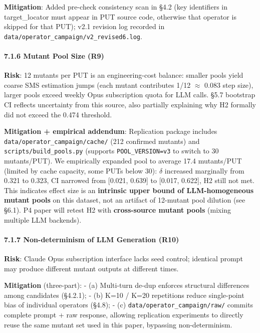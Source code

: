 \documentclass[review,12pt,authoryear]{elsarticle}
\begin{document}
\textbf{Mitigation}: Added pre-check consistency scan in §4.2 (key
identifiers in target\_locator must appear in PUT source code, otherwise
that operator is skipped for that PUT); v2.1 revision log recorded in
\texttt{data/operator\_campaign/v2\_revised6.log}.

\paragraph{7.1.6 Mutant Pool Size (R9)}\label{mutant-pool-size-r9}

\textbf{Risk}: 12 mutants per PUT is an engineering-cost balance:
smaller pools yield coarse SMS estimation jumps (each mutant contributes
1/12 $\approx$ 0.083 step size), larger pools exceed weekly Opus subscription
quota for LLM calls. §5.7 bootstrap CI reflects uncertainty from this
source, also partially explaining why H2 formally did not exceed the
0.474 threshold.

\textbf{Mitigation + empirical addendum}: Replication package includes
\texttt{data/operator\_campaign/cache/} (212 confirmed mutants) and
\texttt{scripts/build\_pools.py} (supports \texttt{POOL\_VERSION=v3} to
switch to 30 mutants/PUT). We empirically expanded pool to average 17.4
mutants/PUT (limited by cache capacity, some PUTs below 30): $\delta$ increased
marginally from 0.321 to 0.323, CI narrowed from {[}0.021, 0.639{]} to
{[}0.017, 0.622{]}, H2 still not met. This indicates effect size is an
\textbf{intrinsic upper bound of LLM-homogeneous mutant pools} on this
dataset, not an artifact of 12-mutant pool dilution (see §6.1). P4 paper
will retest H2 with \textbf{cross-source mutant pools} (mixing multiple
LLM backends).

\paragraph{7.1.7 Non-determinism of LLM Generation
(R10)}\label{non-determinism-of-llm-generation-r10}

\textbf{Risk}: Claude Opus subscription interface lacks seed control;
identical prompt may produce different mutant outputs at different
times.

\textbf{Mitigation} (three-part): - (a) Multi-turn de-dup enforces
structural differences among candidates (§4.2.1); - (b) K=10 / K=20
repetitions reduce single-point bias of individual operators (§4.8); -
(c) \texttt{data/operator\_campaign/raw/} commits complete prompt + raw
response, allowing replication experiments to directly reuse the same
mutant set used in this paper, bypassing non-determinism.
\end{document}
